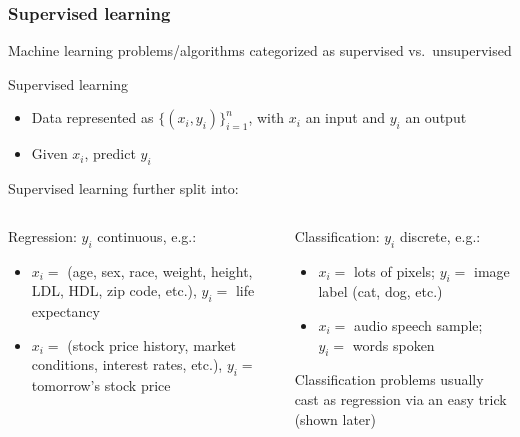 \begin{frame}
    \frametitle{Supervised learning}

    Machine learning problems/algorithms categorized as \alert{supervised} vs.~\alert{unsupervised}

    \begin{block}{Supervised learning}
        \begin{itemize}
            \item Data represented as $\{(x_i, y_i)\}_{i=1}^n$, with $x_i$ an input and $y_i$ an output
            \item Given $x_i$, predict $y_i$
        \end{itemize}
    \end{block}

    Supervised learning further split into: \\[1ex]
    \begin{columns}[t]
        \begin{column}{0.47\textwidth}
            \alert{Regression}: $y_i$ continuous, e.g.:
            \begin{itemize}
                \item $x_i =$ (age, sex, race, weight, height, LDL, HDL, zip code, etc.), $y_i =$ life expectancy
                \item $x_i =$ (stock price history, market conditions, interest rates, etc.), $y_i =$ tomorrow's stock price
            \end{itemize}
        \end{column}
        \begin{column}{0.45\textwidth}
            \alert{Classification}: $y_i$ discrete, e.g.:
            \begin{itemize}
                \item $x_i =$ lots of pixels; $y_i =$ image label (cat, dog, etc.)
                \item $x_i =$ audio speech sample; $y_i =$ words spoken
            \end{itemize}
            Classification problems usually cast as regression via an easy trick (shown later)
        \end{column}
    \end{columns}
\end{frame}

